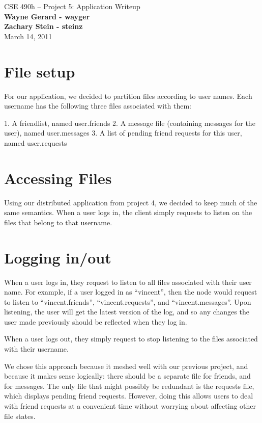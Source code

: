 \documentclass[11pt]{article}
\begin{document}
\begin{center}
{\large CSE 490h -- Project 5: Application Writeup} \\
\textbf{Wayne Gerard - wayger} \\
\textbf{Zachary Stein - steinz} \\
March 14, 2011
\end{center}

\section{File setup}

For our application, we decided to partition files according to user names. Each username has the following three files associated with them:

1. A friendlist, named user.friends
2. A message file (containing messages for the user), named user.messages
3. A list of pending friend requests for this user, named user.requests

\section{Accessing Files}

Using our distributed application from project 4, we decided to keep much of the same semantics. When a user logs in, the client simply requests to listen on the files that belong to that username. 

\section{Logging in/out}

When a user logs in, they request to listen to all files associated with their user name. For example, if a user logged in as ``vincent'', then the node would request to listen to ``vincent.friends'', ``vincent.requests'', and ``vincent.messages''. Upon listening, the user will get the latest version of the log, and so any changes the user made previously should be reflected when they log in. 

When a user logs out, they simply request to stop listening to the files associated with their username. 

We chose this approach because it meshed well with our previous project, and because it makes sense logically: there should be a separate file for friends, and for messages. The only file that might possibly be redundant is the requests file, which displays pending friend requests. However, doing this allows users to deal with friend requests at a convenient time without worrying about affecting other file states.
\end{document}
